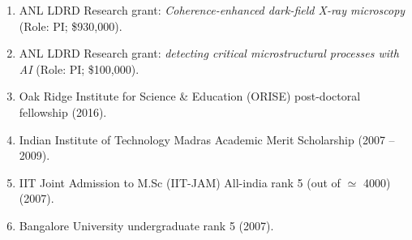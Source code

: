 \begin{enumerate}
   \item ANL LDRD Research grant: \emph{Coherence-enhanced dark-field X-ray microscopy} (Role: PI; \$930,000). 
   \item ANL LDRD Research grant: \emph{detecting critical microstructural processes with AI} (Role: PI; \$100,000). 
   \item Oak Ridge Institute for Science \& Education (ORISE) post-doctoral fellowship (2016). 
   \item Indian Institute of Technology Madras Academic Merit Scholarship (2007 -- 2009). 
   \item IIT Joint Admission to M.Sc (IIT-JAM) All-india rank 5 (out of $\simeq$ 4000) (2007). 
   \item Bangalore University undergraduate rank 5 (2007). 
\end{enumerate}